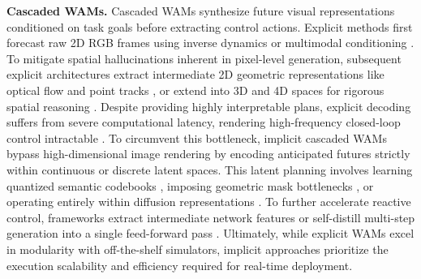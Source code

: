 \textbf{Cascaded WAMs.}
Cascaded WAMs synthesize future visual representations conditioned on task goals before extracting control actions. Explicit methods first forecast raw 2D RGB frames using inverse dynamics or multimodal conditioning \cite{du2023learning,du2024video,intelligence2026pi}. To mitigate spatial hallucinations inherent in pixel-level generation, subsequent explicit architectures extract intermediate 2D geometric representations like optical flow and point tracks \cite{ko2024learning,bharadhwaj2024track2act,xu2024flow}, or extend into 3D and 4D spaces for rigorous spatial reasoning \cite{zhi20253dflowaction,wang2026mvista}. Despite providing highly interpretable plans, explicit decoding suffers from severe computational latency, rendering high-frequency closed-loop control intractable \cite{yan2026s}. To circumvent this bottleneck, implicit cascaded WAMs bypass high-dimensional image rendering by encoding anticipated futures strictly within continuous or discrete latent spaces. This latent planning involves learning quantized semantic codebooks \cite{ye2025latent}, imposing geometric mask bottlenecks \cite{lou2026mask}, or operating entirely within diffusion representations \cite{huang2024ardup}. To further accelerate reactive control, frameworks extract intermediate network features \cite{hu2024video} or self-distill multi-step generation into a single feed-forward pass  \cite{yan2026s}. Ultimately, while explicit WAMs excel in modularity with off-the-shelf simulators, implicit approaches prioritize the execution scalability and efficiency required for real-time deployment.

